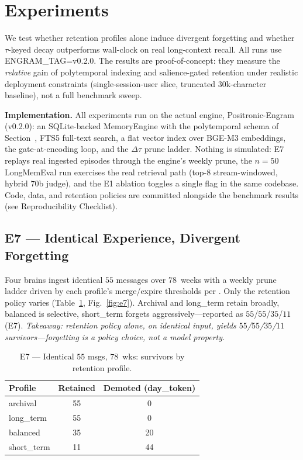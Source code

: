 \documentclass[letterpaper]{article}
\begin{document}
\section{Experiments}
We test whether retention profiles alone induce divergent forgetting and whether $\tau$-keyed decay outperforms wall-clock on real long-context recall. All runs use ENGRAM\_TAG=v0.2.0. The results are proof-of-concept: they measure the \emph{relative} gain of polytemporal indexing and salience-gated retention under realistic deployment constraints (single-session-user slice, truncated $30$k-character baseline), not a full benchmark sweep.

\textbf{Implementation.} All experiments run on the actual engine, Positronic-Engram (v0.2.0): an SQLite-backed MemoryEngine with the polytemporal schema of Section~, FTS5 full-text search, a flat vector index over BGE-M3 embeddings, the gate-at-encoding loop, and the $\Delta\tau$ prune ladder. Nothing is simulated: E7 replays real ingested episodes through the engine's weekly prune, the $n{=}50$ LongMemEval run exercises the real retrieval path (top-$8$ stream-windowed, hybrid $70$b judge), and the E1 ablation toggles a single flag in the same codebase. Code, data, and retention policies are committed alongside the benchmark results (see Reproducibility Checklist).

\subsection{E7 --- Identical Experience, Divergent Forgetting}
Four brains ingest identical $55$ messages over $78$~weeks with a weekly prune ladder driven by each profile's merge/expire thresholds per \citet{zhong2023memorybank}. Only the retention policy varies (Table~\ref{tab:e7}, Fig.~\ref{fig:e7}). Archival and long\_term retain broadly, balanced is selective, short\_term forgets aggressively---reported as $55$/$55$/$35$/$11$ (E7). \emph{Takeaway: retention policy alone, on identical input, yields $55$/$55$/$35$/$11$ survivors---forgetting is a policy choice, not a model property.}

\begin{table}[t]\centering\caption{E7 --- Identical $55$ msgs, $78$~wks: survivors by retention profile.}\label{tab:e7}
\begin{tabular}{lcc}\toprule
Profile & Retained & Demoted (day\_token) \\ \midrule
archival & 55 & 0 \\
long\_term & 55 & 0 \\
balanced & 35 & 20 \\
short\_term & 11 & 44 \\ \bottomrule
\end{tabular}
\end{table}
\end{document}
